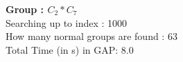 \textbf{Group : $C_2*C_7$}\\
Searching up to index : 1000\\
How many normal groups are found : 63\\
Total Time (in s) in GAP: 8.0\\
